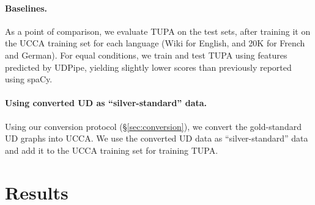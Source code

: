 \documentclass[11pt,a4paper]{article}
\begin{document}
\paragraph{Baselines.}

As a point of comparison, we evaluate TUPA \cite{hershcovich2017a} on the test sets,
after training it on the UCCA training set for each language (Wiki for English,
and 20K for French and German).
For equal conditions,
we train and test TUPA using features predicted by UDPipe,
yielding slightly lower scores than previously reported using spaCy.%

\paragraph{Using converted UD as ``silver-standard'' data.}

Using our conversion protocol (\S\ref{sec:conversion}),
we convert the gold-standard UD graphs into UCCA.
We use the converted UD data as ``silver-standard'' data \cite{W17-7306,N18-1104}
and add it to the UCCA training set for training TUPA.

\section{Results}\label{sec:results}
\end{document}
